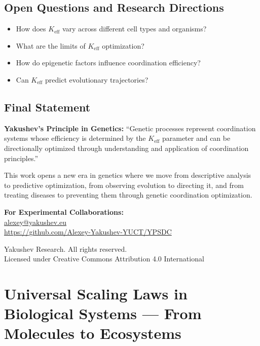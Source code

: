 \documentclass[12pt]{article}
\begin{document}
	\subsection{Open Questions and Research Directions}
	
	\begin{itemize}
		\item How does $K_{\text{eff}}$ vary across different cell types and organisms?
		\item What are the limits of $K_{\text{eff}}$ optimization?
		\item How do epigenetic factors influence coordination efficiency?
		\item Can $K_{\text{eff}}$ predict evolutionary trajectories?
	\end{itemize}
	
	\subsection{Final Statement}
	
	\textbf{Yakushev's Principle in Genetics:}
	``Genetic processes represent coordination systems whose efficiency is determined by the $K_{\text{eff}}$ parameter and can be directionally optimized through understanding and application of coordination principles.''
	
	This work opens a new era in genetics where we move from descriptive analysis to predictive optimization, from observing evolution to directing it, and from treating diseases to preventing them through genetic coordination optimization.
	
	\begin{center}
		\vspace{1cm}
		\textbf{For Experimental Collaborations:}\\
		\url{alexey@yakushev.eu}\\
		\url{https://github.com/Alexey-Yakushev-YUCT/YPSDC}
		
		\vspace{0.5cm}
		 Yakushev Research. All rights reserved.\\
		Licensed under Creative Commons Attribution 4.0 International
	\end{center}
	
	\section{Universal Scaling Laws in Biological Systems — From Molecules to Ecosystems}
	\label{sec:bio-scaling}
	
\end{document}
